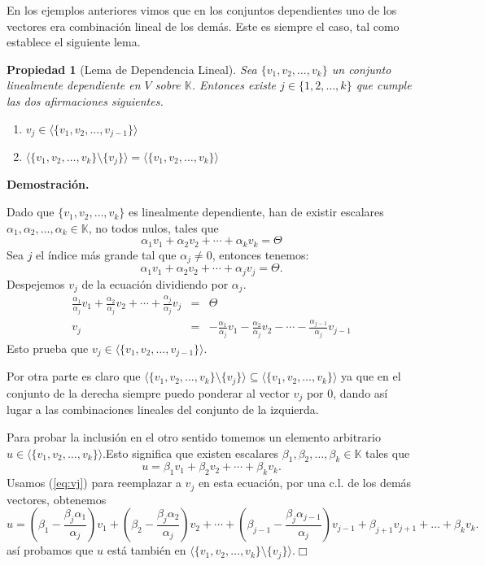 \documentclass[12pt]{book}
\newtheorem{prop}{Propiedad}
\def\K{\mathbb{K}}
\begin{document}
En los ejemplos anteriores vimos que en los conjuntos dependientes uno de los vectores era combinación lineal de los demás. Este es siempre el caso, tal como establece el siguiente lema.

\begin{prop}[Lema de Dependencia Lineal]
Sea $\{v_1,v_2,\dots,v_k\}$ un conjunto linealmente dependiente en $V$ sobre $\K$.
Entonces existe $j\in\{1,2,\dots,k\}$ que cumple las dos afirmaciones siguientes.
\begin{enumerate}
\item $v_j\in\langle\{v_1,v_2,\dots,v_{j-1}\}\rangle$
\item $\langle\{v_1,v_2,\dots,v_k\}\setminus\{v_j\}\rangle=\langle\{v_1,v_2,\dots,v_k\}\rangle$
\end{enumerate}
\end{prop}
{\bf Demostración.} {
Dado que $\{v_1,v_2,\dots,v_k\}$ es linealmente dependiente, han de existir escalares $\alpha_1,\alpha_2,\dots,\alpha_k\in\K$, no todos nulos, tales que 
$$\alpha_1v_1+\alpha_2v_2+\cdots+\alpha_k v_k=\Theta$$
Sea $j$ el índice más grande tal que $\alpha_j\not=0$, entonces tenemos:
$$\alpha_1v_1+\alpha_2v_2+\cdots+\alpha_j v_j=\Theta.$$
Despejemos $v_j$ de la ecuación dividiendo por $\alpha_j$.
\begin{eqnarray}
\frac{\alpha_1}{\alpha_j}v_1+\frac{\alpha_2}{\alpha_j}v_2+\cdots+\frac{\alpha_j}{\alpha_j} v_j&=&\Theta\\
v_j&=&-\frac{\alpha_1}{\alpha_j}v_1-\frac{\alpha_2}{\alpha_j}v_2-\cdots-\frac{\alpha_{j-1}}{\alpha_j} v_{j-1}\label{eq:vj}
\end{eqnarray}
Esto prueba que $v_j\in\langle\{v_1,v_2,\dots,v_{j-1}\}\rangle$.

Por otra parte es claro que $\langle\{v_1,v_2,\dots,v_k\}\setminus\{v_j\}\rangle\subseteq\langle\{v_1,v_2,\dots,v_k\}\rangle$ ya que en el conjunto de la derecha siempre puedo ponderar al vector $v_j$ por 0, dando así lugar a las combinaciones lineales del conjunto de la izquierda.

Para probar la inclusión en el otro sentido tomemos un elemento arbitrario $u\in\langle\{v_1,v_2,\dots,v_k\}\rangle$.Esto significa que existen escalares $\beta_1,\beta_2,\dots,\beta_k\in\K$ tales que 
$$u=\beta_1 v_1+\beta_2 v_2+\cdots+\beta_k v_k.$$
Usamos (\ref{eq:vj}) para reemplazar a $v_j$ en esta ecuación, por una c.l. de los demás vectores, obtenemos
$$u=\left(\beta_1- \frac{\beta_j\alpha_1}{\alpha_j}\right)v_1+\left(\beta_2- \frac{\beta_j\alpha_2}{\alpha_j}\right)v_2+\cdots+\left(\beta_{j-1}- \frac{\beta_j\alpha_{j-1}}{\alpha_j}\right) v_{j-1}+\beta_{j+1}v_{j+1}+\dots+\beta_k v_k.$$
así probamos que $u$ está también en $\langle\{v_1,v_2,\dots,v_k\}\setminus\{v_j\}\rangle$.\hfill $\Box$
}
\end{document}
